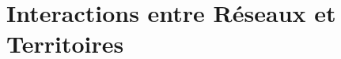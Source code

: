 





\chapter{Interactions entre Réseaux et Territoires}


\label{ch:thematic} %








\bigskip


